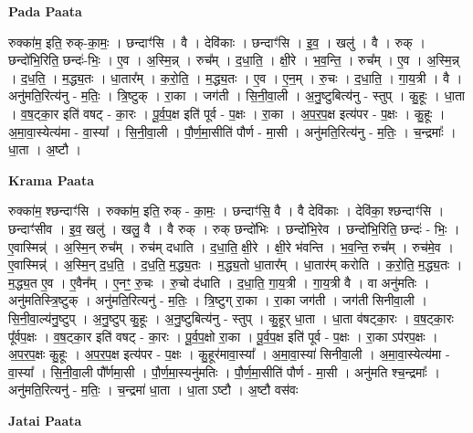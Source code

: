 \documentclass[17pt]{extarticle}
\begin{document}
\textbf{Pada Paata} \newline

रुक्का॑म॒ इति॒ रुक्-का॒मः॒ । छन्दाꣳ॑सि । वै । देवि॑काः । छन्दाꣳ॑सि । इ॒व॒ । खलु॑ । वै । रुक् । छन्दो॑भि॒रिति॒ छन्दः॑-भिः॒ । ए॒व । अ॒स्मि॒न्न् । रुच᳚म् । द॒धा॒ति॒ । क्षी॒रे । भ॒व॒न्ति॒ । रुच᳚म् । ए॒व । अ॒स्मि॒न्न् । द॒ध॒ति॒ । म॒द्ध्य॒तः । धा॒तार᳚म् । क॒रो॒ति॒ । म॒द्ध्य॒तः । ए॒व । ए॒न॒म् । रु॒चः । द॒धा॒ति॒ । गा॒य॒त्री । वै । अनु॑मति॒रित्य॑नु - म॒तिः॒ । त्रि॒ष्टुक् । रा॒का । जग॑ती । सि॒नी॒वा॒ली । अ॒नु॒ष्टुबित्य॑नु - स्तुप् । कु॒हूः । धा॒ता । व॒ष॒ट्का॒र इति॑ वषट् - का॒रः । पू॒र्व॒प॒क्ष इति॑ पूर्व - प॒क्षः । रा॒का । अ॒प॒र॒प॒क्ष इत्य॑पर - प॒क्षः । कु॒हूः । अ॒मा॒वा॒स्येत्य॑मा - वा॒स्या᳚ । सि॒नी॒वा॒ली । पौ॒र्ण॒मा॒सीति॑ पौर्ण - मा॒सी । अनु॑मति॒रित्य॑नु - म॒तिः॒ । च॒न्द्रमाः᳚ । धा॒ता । अ॒ष्टौ ।  \newline


\textbf{Krama Paata} \newline

रुक्का॑म॒ श्छन्दाꣳ॑सि । रुक्का॑म॒ इति॒ रुक् - का॒मः॒ । छन्दाꣳ॑सि॒ वै । वै देवि॑काः । देवि॑का॒ श्छन्दाꣳ॑सि । छन्दाꣳ॑सीव । इ॒व॒ खलु॑ । खलु॒ वै । वै रुक् । रुक् छन्दो॑भिः । छन्दो॑भि॒रेव । छन्दो॑भि॒रिति॒ छन्दः॑ - भिः॒ । ए॒वास्मिन्न्॑ । अ॒स्मि॒न् रुच᳚म् । रुच॑म् दधाति । द॒धा॒ति॒ क्षी॒रे । क्षी॒रे भ॑वन्ति । भ॒व॒न्ति॒ रुच᳚म् । रुच॑मे॒व । ए॒वास्मिन्न्॑ । अ॒स्मि॒न् द॒ध॒ति॒ । द॒ध॒ति॒ म॒द्ध्य॒तः । म॒द्ध्य॒तो धा॒तार᳚म् । धा॒तार॑म् करोति । क॒रो॒ति॒ म॒द्ध्य॒तः । म॒द्ध्य॒त ए॒व । ए॒वैन᳚म् । ए॒नꣳ॒॒ रु॒चः । रु॒चो द॑धाति । द॒धा॒ति॒ गा॒य॒त्री । गा॒य॒त्री वै । वा अनु॑मतिः । अनु॑मतिस्त्रि॒ष्टुक् । अनु॑मति॒रित्यनु॑ - म॒तिः॒ । त्रि॒ष्टुग् रा॒का । रा॒का जग॑ती । जग॑ती सिनीवा॒ली । सि॒नी॒वा॒ल्य॑नु॒ष्टुप् । अ॒नु॒ष्टुप् कु॒हूः । अ॒नु॒ष्टुबित्य॑नु - स्तुप् । कु॒हूर् धा॒ता । धा॒ता व॑षट्का॒रः । व॒ष॒ट्का॒रः पू᳚र्वप॒क्षः । व॒ष॒ट्का॒र इति॑ वषट् - का॒रः । पू॒र्व॒प॒क्षो रा॒का । पू॒र्व॒प॒क्ष इति॑ पूर्व - प॒क्षः । रा॒का ऽप॑रप॒क्षः । अ॒प॒र॒प॒क्षः कु॒हूः । अ॒प॒र॒प॒क्ष इत्य॑पर - प॒क्षः । कु॒हूर॑मावा॒स्या᳚ । अ॒मा॒वा॒स्या॑ सिनीवा॒ली । अ॒मा॒वा॒स्येत्य॑मा - वा॒स्या᳚ । सि॒नी॒वा॒ली पौ᳚र्णमा॒सी । पौ॒र्ण॒मा॒स्यनु॑मतिः । पौ॒र्ण॒मा॒सीति॑ पौर्ण - मा॒सी । अनु॑मति श्च॒न्द्रमाः᳚ । अनु॑मति॒रित्यनु॑ - म॒तिः॒ । च॒न्द्रमा॑ धा॒ता । धा॒ता ऽष्टौ । अ॒ष्टौ वस॑वः \newline

\textbf{Jatai Paata} \newline
\end{document}
